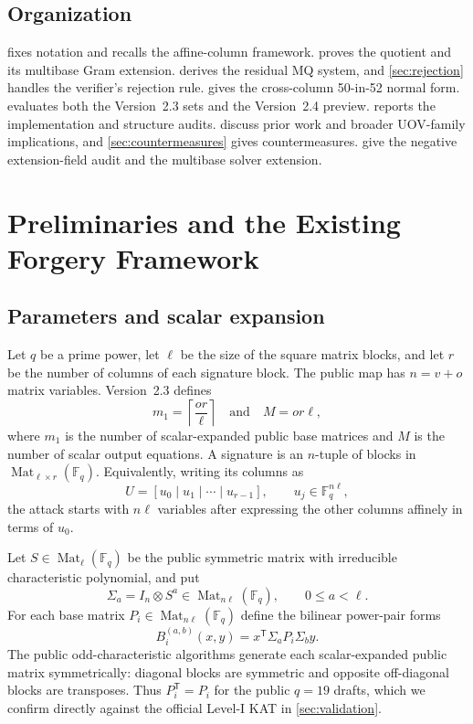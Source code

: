 \documentclass[runningheads]{llncs}
\newcommand{\F}{\mathbb F}
\newcommand{\Mat}{\operatorname{Mat}}
\newcommand{\transpose}{\mathsf T}
\begin{document}
\subsection{Organization}

 fixes notation and recalls the affine-column framework.   proves the quotient and its multibase Gram extension.   derives the residual MQ system, and \cref{sec:rejection} handles the verifier's rejection rule.   gives the cross-column 50-in-52 normal form.   evaluates both the Version~2.3 sets and the Version~2.4 preview.   reports the implementation and structure audits.   discuss prior work and broader UOV-family implications, and \cref{sec:countermeasures} gives countermeasures.   give the negative extension-field audit and the multibase solver extension.

\section{Preliminaries and the Existing Forgery Framework}\label{sec:prelim}

\subsection{Parameters and scalar expansion}

Let $q$ be a prime power, let $\ell$ be the size of the square matrix blocks, and let $r$ be the number of columns of each signature block.  The public map has $n=v+o$ matrix variables.  Version~2.3 defines
\[
 m_1=\left\lceil\frac{or}{\ell}\right\rceil
 \quad\text{and}\quad
 M=or\ell,
\]
where $m_1$ is the number of scalar-expanded public base matrices and $M$ is the number of scalar output equations.  A signature is an $n$-tuple of blocks in $\Mat_{\ell\times r}(\F_q)$.  Equivalently, writing its columns as
\[
 U=[u_0\mid u_1\mid\cdots\mid u_{r-1}],
 \qquad u_j\in\F_q^{n\ell},
\]
the attack starts with $n\ell$ variables after expressing the other columns affinely in terms of $u_0$.

Let $S\in\Mat_{\ell}(\F_q)$ be the public symmetric matrix with irreducible characteristic polynomial, and put
\[
 \Sigma_a=I_n\otimes S^a\in\Mat_{n\ell}(\F_q),
 \qquad 0\le a<\ell.
\]
For each base matrix $P_i\in\Mat_{n\ell}(\F_q)$ define the bilinear power-pair forms
\begin{equation}\label{eq:B}
 B_i^{(a,b)}(x,y)=x^\transpose\Sigma_aP_i\Sigma_b y.
\end{equation}
The public odd-characteristic algorithms generate each scalar-expanded public matrix symmetrically: diagonal blocks are symmetric and opposite off-diagonal blocks are transposes.  Thus $P_i^\transpose=P_i$ for the public $q=19$ drafts, which we confirm directly against the official Level-I KAT in \cref{sec:validation}.
\end{document}
